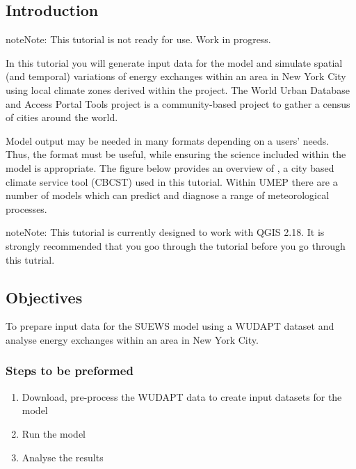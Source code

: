 \documentclass[letterpaper,10pt,english]{sphinxmanual}
\begin{document}
\subsection{Introduction}
\label{\detokenize{Tutorials/SuewsWUDAPT:introduction}}
\begin{sphinxadmonition}{note}{Note:}
This tutorial is not ready for use. Work in progress.
\end{sphinxadmonition}

In this tutorial you will generate input data for the
 model and simulate spatial
(and temporal) variations of energy exchanges within an area in New York City using local climate zones derived within the  project. The World Urban Database and Access Portal Tools project is a community-based project to gather a census of cities around the world.

Model output may be needed in many formats depending on a users’ needs.
Thus, the format must be useful, while ensuring the science included
within the model is appropriate. The figure below provides an overview of
{\hyperref[\detokenize{index:index-page}]{}}, a city based climate
service tool (CBCST) used in this tutorial. Within UMEP there are a number
of models which can predict and diagnose a range of meteorological processes.

\begin{sphinxadmonition}{note}{Note:}
This tutorial is currently designed to work with QGIS 2.18. It is strongly recommended that you goo through the {\hyperref[\detokenize{Tutorials/SuewsSpatial:suewsspatial}]{}} tutorial before you go through this tutrial.
\end{sphinxadmonition}


\subsection{Objectives}
\label{\detokenize{Tutorials/SuewsWUDAPT:objectives}}
To prepare input data for the SUEWS model using a WUDAPT dataset and analyse energy exchanges within an area in New York City.


\subsubsection{Steps to be preformed}
\label{\detokenize{Tutorials/SuewsWUDAPT:steps-to-be-preformed}}\begin{enumerate}
\item {} 
Download, pre-process the WUDAPT data to create input datasets for the  model

\item {} 
Run the model

\item {} 
Analyse the results

\end{enumerate}
\end{document}
